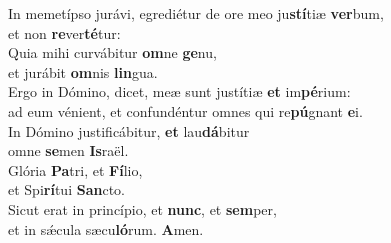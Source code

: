\oddverse In memetípso jurávi, egrediétur de ore meo ju\textbf{stí}tiæ \textbf{ver}bum,~\*\\
\oddverse et non \textbf{re}ver\textbf{té}tur:\\
\evenverse Quia mihi curvábitur \textbf{om}ne \textbf{ge}nu,~\*\\
\evenverse et jurábit \textbf{om}nis \textbf{lin}gua.\\
\oddverse Ergo in Dómino, dicet, meæ sunt justítiæ \textbf{et} im\textbf{pé}rium:~\*\\
\oddverse ad eum vénient, et confundéntur omnes qui re\textbf{pú}gnant \textbf{e}i.\\
\evenverse In Dómino justificábitur, \textbf{et} lau\textbf{dá}bitur~\*\\
\evenverse omne \textbf{se}men \textbf{Is}raël.\\
\oddverse Glória \textbf{Pa}tri, et \textbf{Fí}lio,~\*\\
\oddverse et Spi\textbf{rí}tui \textbf{San}cto.\\
\evenverse Sicut erat in princípio, et \textbf{nunc}, et \textbf{sem}per,~\*\\
\evenverse et in sǽcula sæcu\textbf{ló}rum. \textbf{A}men.\\

